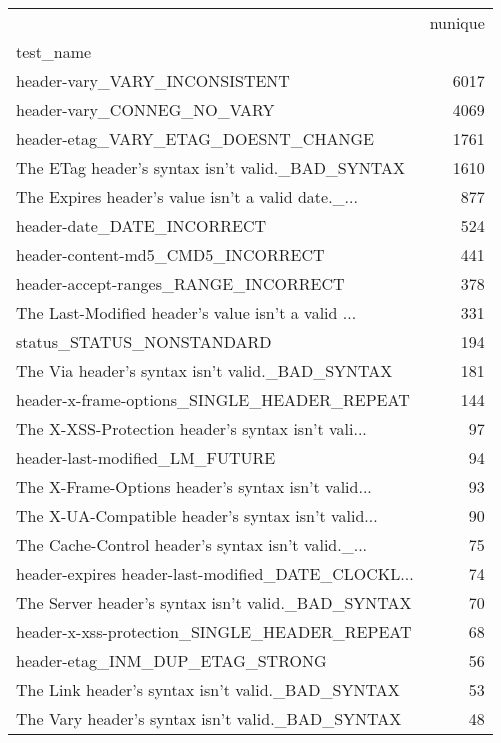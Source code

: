 \begin{tabular}{lr}
\toprule
{} &  nunique \\
test\_name                                          &          \\
\midrule
header-vary\_VARY\_INCONSISTENT                      &     6017 \\
header-vary\_CONNEG\_NO\_VARY                         &     4069 \\
header-etag\_VARY\_ETAG\_DOESNT\_CHANGE                &     1761 \\
The ETag header's syntax isn't valid.\_BAD\_SYNTAX   &     1610 \\
The Expires header's value isn't a valid date.\_... &      877 \\
header-date\_DATE\_INCORRECT                         &      524 \\
header-content-md5\_CMD5\_INCORRECT                  &      441 \\
header-accept-ranges\_RANGE\_INCORRECT               &      378 \\
The Last-Modified header's value isn't a valid ... &      331 \\
status\_STATUS\_NONSTANDARD                          &      194 \\
The Via header's syntax isn't valid.\_BAD\_SYNTAX    &      181 \\
header-x-frame-options\_SINGLE\_HEADER\_REPEAT        &      144 \\
The X-XSS-Protection header's syntax isn't vali... &       97 \\
header-last-modified\_LM\_FUTURE                     &       94 \\
The X-Frame-Options header's syntax isn't valid... &       93 \\
The X-UA-Compatible header's syntax isn't valid... &       90 \\
The Cache-Control header's syntax isn't valid.\_... &       75 \\
header-expires header-last-modified\_DATE\_CLOCKL... &       74 \\
The Server header's syntax isn't valid.\_BAD\_SYNTAX &       70 \\
header-x-xss-protection\_SINGLE\_HEADER\_REPEAT       &       68 \\
header-etag\_INM\_DUP\_ETAG\_STRONG                    &       56 \\
The Link header's syntax isn't valid.\_BAD\_SYNTAX   &       53 \\
The Vary header's syntax isn't valid.\_BAD\_SYNTAX   &       48 \\

\end{tabular}
